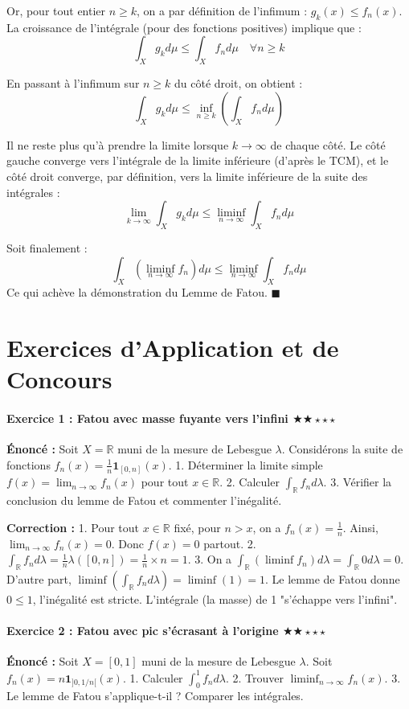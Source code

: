 \documentclass[11pt,a4paper]{article}
\begin{document}
Or, pour tout entier $n \ge k$, on a par définition de l'infimum : $g_k(x) \le f_n(x)$.
La croissance de l'intégrale (pour des fonctions positives) implique que :
$$ \int_X g_k d\mu \le \int_X f_n d\mu \quad \forall n \ge k $$

En passant à l'infimum sur $n \ge k$ du côté droit, on obtient :
$$ \int_X g_k d\mu \le \inf_{n \ge k} \left( \int_X f_n d\mu \right) $$

Il ne reste plus qu'à prendre la limite lorsque $k \to \infty$ de chaque côté. Le côté gauche converge vers l'intégrale de la limite inférieure (d'après le TCM), et le côté droit converge, par définition, vers la limite inférieure de la suite des intégrales :
$$ \lim_{k \to \infty} \int_X g_k d\mu \le \liminf_{n \to \infty} \int_X f_n d\mu $$

Soit finalement :
$$ \int_X \left( \liminf_{n \to \infty} f_n \right) d\mu \le \liminf_{n \to \infty} \int_X f_n d\mu $$
Ce qui achève la démonstration du Lemme de Fatou. $\blacksquare$

\newpage
\part{Exercices d'Application et de Concours}

\subsection*{Exercice 1 : Fatou avec masse fuyante vers l'infini \quad $\bigstar\bigstar\star\star\star$}
\textbf{Énoncé :}
Soit $X = \mathbb{R}$ muni de la mesure de Lebesgue $\lambda$.
Considérons la suite de fonctions $f_n(x) = \frac{1}{n} \mathbf{1}_{[0, n]}(x)$.
1. Déterminer la limite simple $f(x) = \lim_{n \to \infty} f_n(x)$ pour tout $x \in \mathbb{R}$.
2. Calculer $\int_{\mathbb{R}} f_n d\lambda$.
3. Vérifier la conclusion du lemme de Fatou et commenter l'inégalité.

\textbf{Correction :}
1. Pour tout $x \in \mathbb{R}$ fixé, pour $n > x$, on a $f_n(x) = \frac{1}{n}$. Ainsi, $\lim_{n \to \infty} f_n(x) = 0$. Donc $f(x) = 0$ partout.
2. $\int_{\mathbb{R}} f_n d\lambda = \frac{1}{n} \lambda([0, n]) = \frac{1}{n} \times n = 1$.
3. On a $\int_{\mathbb{R}} (\liminf f_n) d\lambda = \int_{\mathbb{R}} 0 d\lambda = 0$.
D'autre part, $\liminf \left( \int_{\mathbb{R}} f_n d\lambda \right) = \liminf (1) = 1$.
Le lemme de Fatou donne $0 \le 1$, l'inégalité est stricte. L'intégrale (la masse) de 1 "s'échappe vers l'infini".


\subsection*{Exercice 2 : Fatou avec pic s'écrasant à l'origine \quad $\bigstar\bigstar\star\star\star$}
\textbf{Énoncé :}
Soit $X = [0, 1]$ muni de la mesure de Lebesgue $\lambda$.
Soit $f_n(x) = n \mathbf{1}_{]0, 1/n[}(x)$.
1. Calculer $\int_{0}^{1} f_n d\lambda$.
2. Trouver $\liminf_{n \to \infty} f_n(x)$.
3. Le lemme de Fatou s'applique-t-il ? Comparer les intégrales.
\end{document}
